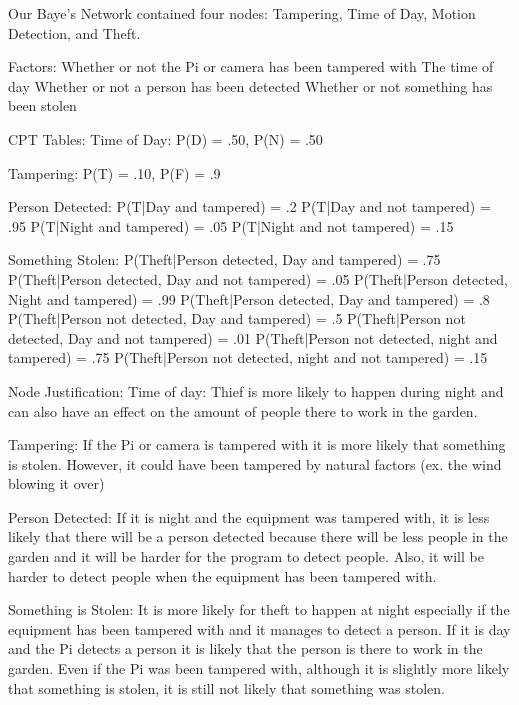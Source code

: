 Our Baye's Network contained four nodes: Tampering, Time of Day, Motion Detection, and Theft.

Factors:
  Whether or not the Pi or camera has been tampered with
  The time of day
  Whether or not a person has been detected
  Whether or not something has been stolen

CPT Tables:
  Time of Day:
    P(D) = .50, P(N) = .50

  Tampering:
    P(T) = .10, P(F) = .9

  Person Detected:
    P(T|Day and tampered) = .2
    P(T|Day and not tampered) = .95
    P(T|Night and tampered) = .05
    P(T|Night and not tampered) = .15

  Something Stolen:
    P(Theft|Person detected, Day and tampered) = .75
    P(Theft|Person detected, Day and not tampered) = .05
    P(Theft|Person detected, Night and tampered) = .99
    P(Theft|Person detected, Day and tampered) = .8
    P(Theft|Person not detected, Day and tampered) = .5
    P(Theft|Person not detected, Day and not tampered) = .01
    P(Theft|Person not detected, night and tampered) = .75
    P(Theft|Person not detected, night and not tampered) = .15

Node Justification:
  Time of day:
    Thief is more likely to happen during night and can also have an effect on
    the amount of people there to work in the garden.

  Tampering:
    If the Pi or camera is tampered with it is more likely that something is
    stolen. However, it could have been tampered by natural factors (ex. the
    wind blowing it over)

  Person Detected:
    If it is night and the equipment was tampered with, it is less likely that
    there will be a person detected because there will be less people in the
    garden and it will be harder for the program to detect people. Also, it will
    be harder to detect people when the equipment has been tampered with.

  Something is Stolen:
    It is more likely for theft to happen at night especially if the equipment
    has been tampered with and it manages to detect a person. If it is day and
    the Pi detects a person it is likely that the person is there to work in the
    garden. Even if the Pi was been tampered with, although it is slightly more
    likely that something is stolen, it is still not likely that something was
    stolen.   